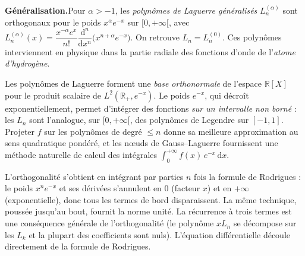 \begin{tcolorbox}[thmbox]
  \medskip
  \textbf{Généralisation.}\enspace Pour $\alpha>-1$, les \emph{polynômes de
  Laguerre généralisés} $L_n^{(\alpha)}$ sont orthogonaux pour le poids
  $x^{\alpha}e^{-x}$ sur $[0,+\infty[$, avec
  $L_n^{(\alpha)}(x)=\dfrac{x^{-\alpha}e^{x}}{n!}\dfrac{\mathrm{d}^n}{\mathrm{d}x^n}
  \bigl(x^{n+\alpha}e^{-x}\bigr)$. On retrouve $L_n=L_n^{(0)}$. Ces polynômes
  interviennent en physique dans la partie radiale des fonctions d'onde de
  l'\emph{atome d'hydrogène}.
\end{tcolorbox}

\begin{significationintuitive}
Les polynômes de Laguerre forment une \emph{base orthonormale} de
l'espace $\mathbb{R}[X]$ pour le produit scalaire de $L^2(\mathbb{R}_+,e^{-x})$.
Le poids $e^{-x}$, qui décroît exponentiellement, permet d'intégrer des
fonctions \emph{sur un intervalle non borné} : les $L_n$ sont l'analogue,
sur $[0,+\infty[$, des polynômes de Legendre sur $[-1,1]$. Projeter $f$ sur
les polynômes de degré $\leq n$ donne sa meilleure approximation au sens
quadratique pondéré, et les nœuds de Gauss--Laguerre fournissent une méthode
naturelle de calcul des intégrales $\int_0^{+\infty} f(x)\,e^{-x}\,\mathrm{d}x$.
\end{significationintuitive}

\decsep{}


\begin{ideepreuve}
L'orthogonalité s'obtient en intégrant par parties $n$ fois la formule de
Rodrigues : le poids $x^n e^{-x}$ et ses dérivées s'annulent en $0$ (facteur
$x$) et en $+\infty$ (exponentielle), donc tous les termes de bord
disparaissent. La même technique, poussée jusqu'au bout, fournit la norme
unité. La récurrence à trois termes est une conséquence générale de
l'orthogonalité (le polynôme $xL_n$ se décompose sur les $L_k$ et la plupart
des coefficients sont nuls). L'équation différentielle découle directement de
la formule de Rodrigues.
\end{ideepreuve}

\vspace{10pt}

